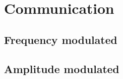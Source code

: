 \chapter{Communication}
\section{Frequency modulated}
\subsection{}


\section{Amplitude modulated}


